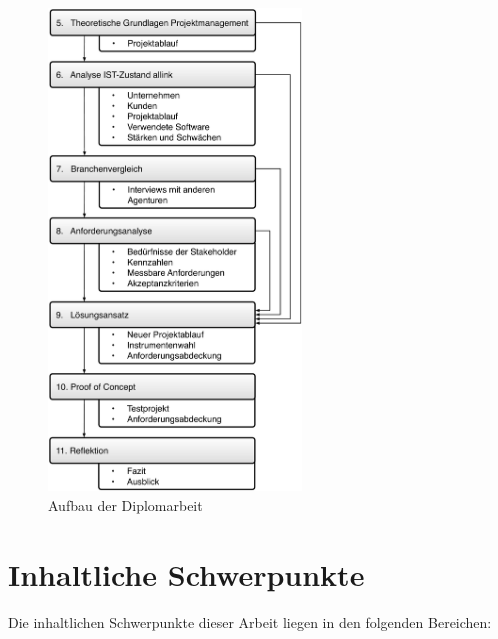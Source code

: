 \begin{figure}[htbp]
\begin{center}
\includegraphics[width=0.6\textwidth,angle=0]{./bilder/einleitung/01_gliederung_arbeit.pdf}
\caption[Aufbau der Diplomarbeit]{Aufbau der Diplomarbeit\footnotemark}
\label{pic:01_gliederung_arbeit}
\end{center}
\end{figure}

\clearpage

\section{Inhaltliche Schwerpunkte}
Die inhaltlichen Schwerpunkte dieser Arbeit liegen in den folgenden Bereichen:

